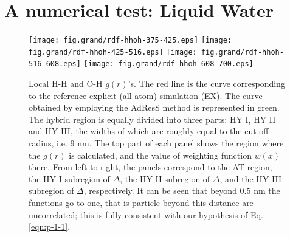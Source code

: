 \documentclass[aip,jcp,a4paper,reprint,onecolumn]{revtex4-1}
\begin{document}
\section{A numerical test: Liquid Water}
\begin{figure}
  \centering
  \texttt{[image: fig.grand/rdf-hhoh-375-425.eps]}
  \texttt{[image: fig.grand/rdf-hhoh-425-516.eps]}
  \texttt{[image: fig.grand/rdf-hhoh-516-608.eps]}
  \texttt{[image: fig.grand/rdf-hhoh-608-700.eps]}
  \caption{Local H-H and O-H $g(r)$'s.
    The red line is the curve corresponding to the reference explicit (all atom)
    simulation (EX).
    The curve obtained by employing the AdResS 
    method is represented in green.
    The hybrid region is equally
    divided into three parts: HY I, HY II and HY III, the widths of
    which are roughly equal to the cut-off radius, i.e. 9 \textsf{nm}.    
    The top part of each panel shows the region where the $g(r)$ is calculated,
    and the value of weighting function $w(x)$ there.
    From left to right, the panels correspond to the AT region, 
    the HY I subregion of $\Delta$,
    the HY II subregion of $\Delta$,
    and the HY III subregion of $\Delta$, respectively. It can be seen that beyond 0.5 \textsf{nm} the functions go to one, that is particle beyond this distance are uncorrelated; this is fully consistent with our hypothesis of Eq.\ref{eqn:p-1-1}.}
  \label{fig:tmp2a}
\end{figure}
\end{document}
